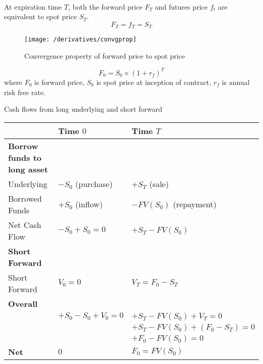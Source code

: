 \begin{remark} \\
At expiration time $T$, both the forward price $F_T$ and futures price $f_t$ are equivalent to spot price $S_T$.
\begin{equation}
F_T = f_T = S_T \nonumber
\end{equation}
\end{remark}

\begin{figure}[H]
\centering
\texttt{[image: /derivatives/convgprop]}
\caption{Convergence property of forward price to spot price}
\end{figure}

\begin{definition} 
\begin{equation}
F_0 = S_0 \times (1+r_f)^T \nonumber
\end{equation}
where $F_0$ is forward price, $S_0$ is spot price at inception of contract, $r_f$ is annual risk free rate.
\end{definition}

\begin{flushleft}
Cash flows from long underlying and short forward
\begin{tabularx}{\textwidth}{X|X|X}
\hline
\rowcolor{gray!30}
& Time $0$ & Time $T$ \\
\hline
\textbf{Borrow funds to long asset} & & \\
Underlying & $-S_0$ (purchase) & $+S_T$ (sale) \\
Borrowed Funds & $+S_0$ (inflow) & $-FV(S_0)$ (repayment) \\
Net Cash Flow & $-S_0 + S_0 = 0$ & $+S_T - FV(S_0)$ \\
\textbf{Short Forward} & & \\
Short Forward & $V_0 = 0$ & $V_T = F_0 - S_T$ \\
\textbf{Overall} & & \\
& $+S_0 - S_0 + V_0 = 0$ & $+S_T - FV(S_0) + V_T = 0$\\
& & $+S_T - FV(S_0) + (F_0 - S_T) = 0$\\
& & $+F_0 - FV(S_0) = 0$\\
\textbf{Net} & $0$ & $F_0 = FV(S_0)$\\
\hline 
\end{tabularx}
\end{flushleft}

